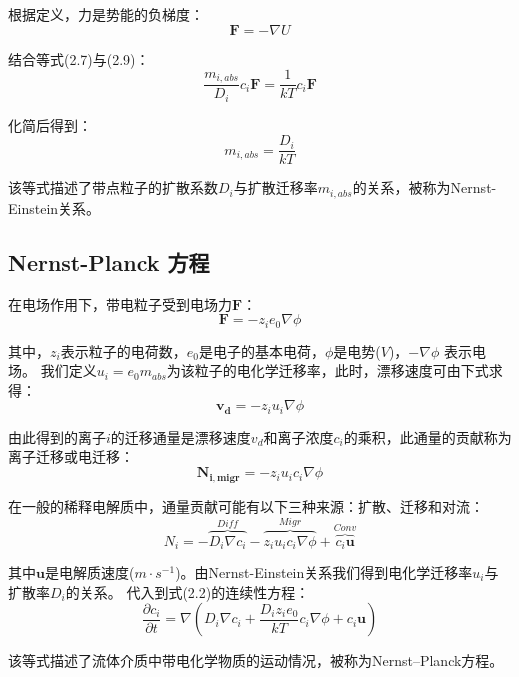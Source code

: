 根据定义，力是势能的负梯度：
\begin{equation}
    \mathbf{F}=-\nabla{U}
\end{equation}

结合等式(2.7)与(2.9)：
\begin{equation}
    \frac{m_{i,abs}}{D_i}c_i\mathbf{F}=\frac{1}{kT}c_i\mathbf{F}
\end{equation}

化简后得到：
\begin{equation}
    m_{i,abs}=\frac{D_i}{kT}
\end{equation}

该等式描述了带点粒子的扩散系数$D_i$与扩散迁移率$m_{i,abs}$的关系，被称为Nernst-Einstein关系。\cite{Mehrer2007,CONWAY1972250}
\subsection{Nernst-Planck 方程}
在电场作用下，带电粒子受到电场力$\mathbf{F}$：
\begin{equation}
    \mathbf{F}=-z_ie_0\nabla\phi
\end{equation}

其中，$z_i$表示粒子的电荷数，$e_0$是电子的基本电荷，$\phi$是电势($V$)，$−\nabla{\phi}$ 表示电场。
我们定义$u_i=e_0m_{abs}$为该粒子的电化学迁移率，此时，漂移速度可由下式求得：
\begin{equation}
   \mathbf{v_d}=-z_iu_i\nabla\phi
\end{equation}

由此得到的离子$i$的迁移通量是漂移速度$v_d$和离子浓度$c_i$的乘积，此通量的贡献称为离子迁移或电迁移：
\begin{equation}
    \mathbf{N_{i,migr}}=-z_iu_ic_i\nabla\phi
\end{equation}

在一般的稀释电解质中，通量贡献可能有以下三种来源：扩散、迁移和对流：
\begin{equation}
    N_i=-\overbrace{D_i\nabla{c_i}}^{Diff}-\overbrace{z_iu_ic_i\nabla\phi}^{Migr}+\overbrace{c_i\mathbf{u}}^{Conv}
\end{equation}

其中$\mathbf{u}$是电解质速度($m\cdot{s^{-1}}$)。由Nernst-Einstein关系我们得到电化学迁移率$u_i$与扩散率$D_i$的关系。
代入到式(2.2)的连续性方程：
\begin{equation}
    \frac{\partial c_i}{\partial t}=\nabla{(D_i\nabla{c_i}+\frac{D_iz_ie_0}{kT}c_i\nabla\phi+c_i\mathbf{u})}
\end{equation}

该等式描述了流体介质中带电化学物质的运动情况，被称为Nernst–Planck方程。\cite{Mehrer2007}
